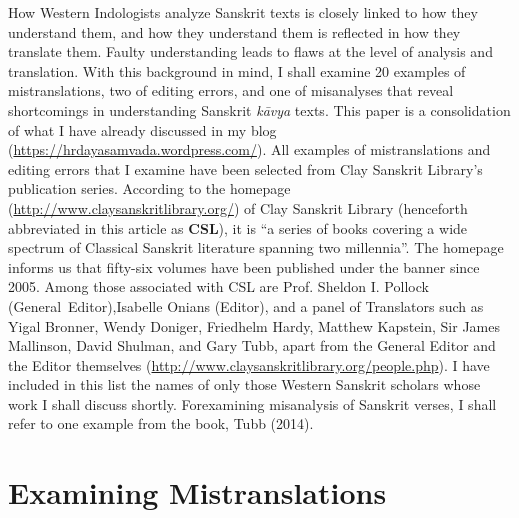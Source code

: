How Western Indologists analyze Sanskrit texts is closely linked to how they understand them, and how they understand them is reflected in how they translate them. Faulty understanding leads to flaws at the level of analysis and translation. With this background in mind, I shall examine 20 examples of mistranslations, two of editing errors, and one of misanalyses that reveal shortcomings in understanding Sanskrit \textsl{kāvya} texts. This paper is a consolidation of what I have already discussed in my blog (\url{https://hrdayasamvada.wordpress.com/}). All examples of mistranslations and editing errors that I examine have been selected from Clay Sanskrit Library's publication series. According to the homepage (\url{http://www.claysanskritlibrary.org/}) of Clay Sanskrit Library (henceforth abbreviated in this article as \textbf{CSL}), it is “a series of books covering a wide spectrum of Classical Sanskrit literature spanning two millennia”. The homepage informs us that fifty-six volumes have been published under the banner since 2005. Among those associated with CSL are Prof. Sheldon I. Pollock \hbox{(General Editor)},\break \hbox{Isabelle} Onians (Editor), and a panel of Translators such as Yigal Bronner, Wendy Doniger, Friedhelm Hardy, Matthew Kapstein, Sir James Mallinson, David Shulman, and Gary Tubb, apart from the General Editor and the Editor themselves (\url{http://www.claysanskritlibrary.org/people.php}). I have included in this list the names of only those Western Sanskrit scholars whose work I shall discuss shortly. For\break examining misanalysis of Sanskrit verses, I shall refer to one example from the book, Tubb (2014).\\[-21pt]

\section*{Examining Mistranslations}

